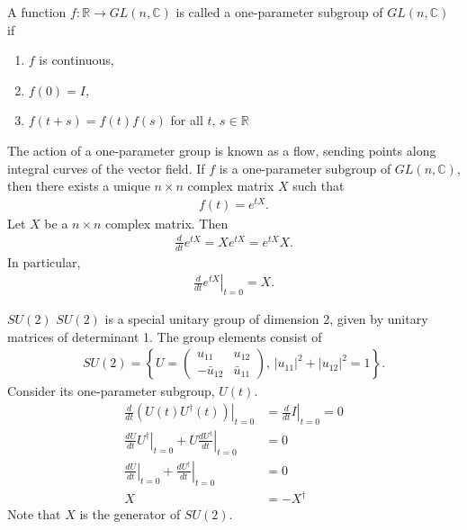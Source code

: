 \documentclass{beamer}
\begin{document}
\begin{frame}
\justify
A function $f:\mathbb{R} \rightarrow GL(n,\mathbb{C})$ is called a one-parameter subgroup of $GL(n,\mathbb{C})$ if
\begin{enumerate}
\item $f$ is continuous,
\item $f(0)=I$,
\item $f(t+s) = f(t) f(s)$ for all $t,\,s\in\mathbb{R}$
\end{enumerate}
\vfill
The action of a one-parameter group is known as a flow, sending points along integral curves of the vector field.
\vfill
If $f$ is a one-parameter subgroup of $GL(n,\mathbb{C})$, then there exists a unique $n\times n$ complex matrix $X$ such that
\begin{align}
f(t) = e^{tX}.
\end{align}
\vfill
Let $X$ be a $n\times n$ complex matrix. Then
\begin{align}
\frac{d}{dt} e^{tX} = X e^{tX} = e^{tX} X.
\end{align}
In particular,
\begin{align}
\left. \frac{d}{dt} e^{tX} \right|_{t=0} = X.
\end{align}
\end{frame}

\begin{frame}{$SU(2)$}
\justify
$SU(2)$ is a special unitary group of dimension 2, given by unitary matrices of determinant 1. The group elements consist of
\begin{align}
SU(2) = \left\{ U = \begin{pmatrix} u_{11} & u_{12} \\ -\bar{u}_{12} & \bar{u}_{11} \end{pmatrix},\, |u_{11}|^2 + |u_{12}|^2 = 1 \right\}.
\end{align}
\vfill
Consider its one-parameter subgroup, $U(t)$.
\begin{align}
\left. \frac{d}{dt} (U(t) U^\dagger(t)) \right|_{t=0} & = \left. \frac{d}{dt} I \right|_{t=0} = 0 \nonumber \\
\left. \frac{dU}{dt} U^\dagger \right|_{t=0} + \left. U \frac{dU^\dagger}{dt} \right|_{t=0} & = 0 \nonumber \\
\left. \frac{dU}{dt} \right|_{t=0} + \left. \frac{dU^\dagger}{dt} \right|_{t=0} & = 0 \nonumber \\
X & = -X^\dagger
\end{align}
Note that $X$ is the generator of $SU(2)$.
\end{frame}
\end{document}
